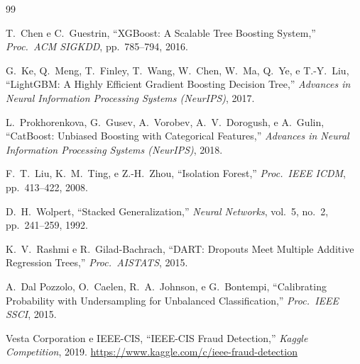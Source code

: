 \documentclass[12pt,a4paper]{article}
\begin{document}
\begin{thebibliography}{99}

T.~Chen e C.~Guestrin,
``XGBoost: A Scalable Tree Boosting System,''
\textit{Proc.\ ACM SIGKDD}, pp.~785--794, 2016.

G.~Ke, Q.~Meng, T.~Finley, T.~Wang, W.~Chen, W.~Ma, Q.~Ye, e T.-Y.~Liu,
``LightGBM: A Highly Efficient Gradient Boosting Decision Tree,''
\textit{Advances in Neural Information Processing Systems (NeurIPS)}, 2017.

L.~Prokhorenkova, G.~Gusev, A.~Vorobev, A.~V.~Dorogush, e A.~Gulin,
``CatBoost: Unbiased Boosting with Categorical Features,''
\textit{Advances in Neural Information Processing Systems (NeurIPS)}, 2018.

F.~T.~Liu, K.~M.~Ting, e Z.-H.~Zhou,
``Isolation Forest,''
\textit{Proc.\ IEEE ICDM}, pp.~413--422, 2008.

D.~H.~Wolpert,
``Stacked Generalization,''
\textit{Neural Networks}, vol.~5, no.~2, pp.~241--259, 1992.

K.~V.~Rashmi e R.~Gilad-Bachrach,
``DART: Dropouts Meet Multiple Additive Regression Trees,''
\textit{Proc.\ AISTATS}, 2015.

A.~Dal Pozzolo, O.~Caelen, R.~A.~Johnson, e G.~Bontempi,
``Calibrating Probability with Undersampling for Unbalanced Classification,''
\textit{Proc.\ IEEE SSCI}, 2015.

Vesta Corporation e IEEE-CIS,
``IEEE-CIS Fraud Detection,''
\textit{Kaggle Competition}, 2019.
\url{https://www.kaggle.com/c/ieee-fraud-detection}

\end{thebibliography}
\end{document}
